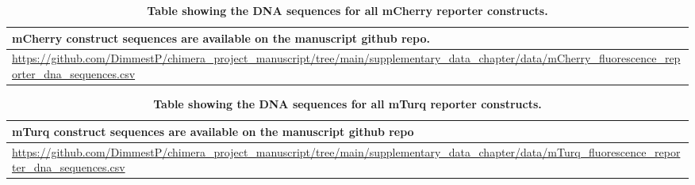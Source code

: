 \documentclass[../main.tex]{subfiles}
\begin{document}
\begin{table}[ph!]
\def\arraystretch{1.25}
\centering
\setlength{\tabcolsep}{5pt}\fontsize{9}{9}\selectfont
\begin{tabular}[t]{>{\centering\arraybackslash}p{30em}}
\hline
mCherry construct sequences are available on the manuscript github repo.\\
\hline
\url{https://github.com/DimmestP/chimera_project_manuscript/tree/main/supplementary_data_chapter/data/mCherry_fluorescence_reporter_dna_sequences.csv}\\
\hline
\end{tabular}
\caption[Table showing the DNA sequences for all mCherry reporter constructs.]{\label{tab:mCherry-seq}\textbf{Table showing the DNA sequences for all mCherry reporter constructs.}}
\end{table}

\begin{table}[ph!]
\def\arraystretch{1.25}
\centering
\setlength{\tabcolsep}{5pt}\fontsize{9}{9}\selectfont
\begin{tabular}[t]{>{\centering\arraybackslash}p{30em}}
\hline
mTurq construct sequences are available on the manuscript github repo\\
\hline
\url{https://github.com/DimmestP/chimera_project_manuscript/tree/main/supplementary_data_chapter/data/mTurq_fluorescence_reporter_dna_sequences.csv}\\
\hline
\end{tabular}
\caption[Table showing the DNA sequences for all mTurq reporter constructs.]{\label{tab:mTurq-seq}\textbf{Table showing the DNA sequences for all mTurq reporter constructs.}}
\end{table}

\end{document}
